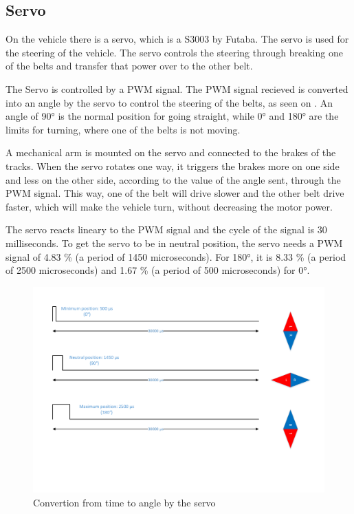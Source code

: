 \subsection{Servo}
On the vehicle there is a servo, which is a S3003 by Futaba.
The servo is used for the steering of the vehicle. The servo controls the steering through breaking one of the belts and transfer that power over to the other belt.


The Servo is controlled by a PWM signal. The PWM signal recieved is converted into an angle by the servo to control the steering of the belts, as seen on . An angle of 90° is the normal position for going straight, while 0° and 180° are the limits for turning, where one of the belts is not moving. 

A mechanical arm is mounted on the servo and connected to the brakes of the tracks. When the servo rotates one way, it triggers the brakes more on one side and less on the other side, according to the value of the angle sent, through the PWM signal. This way, one of the belt will drive slower and the other belt drive faster, which will make the vehicle turn, without decreasing the motor power.

The servo reacts lineary to the PWM signal and the cycle of the signal is 30 milliseconds. To get the servo to be in neutral position, the servo needs a PWM signal of 4.83 \% (a period of 1450 microseconds). For 180°, it is 8.33 \% (a period of 2500 microseconds) and 1.67 \% (a period of 500 microseconds) for 0°. \\


\begin{figure}[H]
	\centering
	\includegraphics[scale=0.6]{figures/TimeVSangle.pdf}
	\caption{Convertion from time to angle by the servo\cite {AServos}}
	\label{timeVSangle}
\end{figure}

